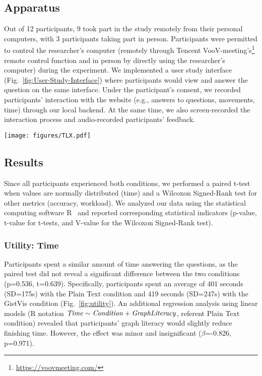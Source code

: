 \subsection{Apparatus}
Out of 12 participants, 9 took part in the study remotely from their personal computers, with 3 participants taking part in person. Participants were permitted to control the researcher's computer (remotely through Tencent VooV-meeting's\footnote{\url{https://voovmeeting.com/}} remote control function and in person by directly using the researcher's computer) during the experiment. We implemented a user study interface (Fig.~\ref{fig:User-Study-Interface}) where participants would view and answer the question on the same interface. Under the participant's consent, we recorded participants' interaction with the website (e.g., answers to questions, movements, time) through our local backend. At the same time, we also screen-recorded the interaction process and audio-recorded participants' feedback. 


\begin{figure*}[t]
  \centering
  \texttt{[image: figures/TLX.pdf]}
  \caption{A comparison of perceived workload between GistVis and Plain Text over NASA-TLX metrics. Each scatter point in the graph represents one individual record from one participant. We map the values with a divergent color scheme from red (1-very low) to blue (21-very high). The black dot and the black line indicate the mean and 95\% confidence interval of the metric.}
  \label{fig:nasa-tlx}
\end{figure*}

\subsection{Results}
Since all participants experienced both conditions, we performed a paired t-test when values are normally distributed (time) and a Wilcoxon Signed-Rank test for other metrics (accuracy, workload). We analyzed our data using the statistical computing software R~\cite{r2013r} and reported corresponding statistical indicators (p-value, t-value for t-tests, and V-value for the Wilcoxon Signed-Rank test).

\subsubsection{Utility: Time}
Participants spent a similar amount of time answering the questions, as the paired test did not reveal a significant difference between the two conditions (p=0.536, t=0.639). Specifically, participants spent an average of 401 seconds (SD=175s) with the Plain Text condition and 419 seconds (SD=247s) with the GistVis condition (Fig.~\ref{fig:utility}). An additional regression analysis using linear models (R notation $\text{\textit{Time}} \sim \text{\textit{Condition}} + \text{\textit{GraphLiteracy}}$, referent Plain Text condition) revealed that participants' graph literacy would slightly reduce finishing time. However, the effect was minor and insignificant ($\beta$=-0.826, p=0.971).

